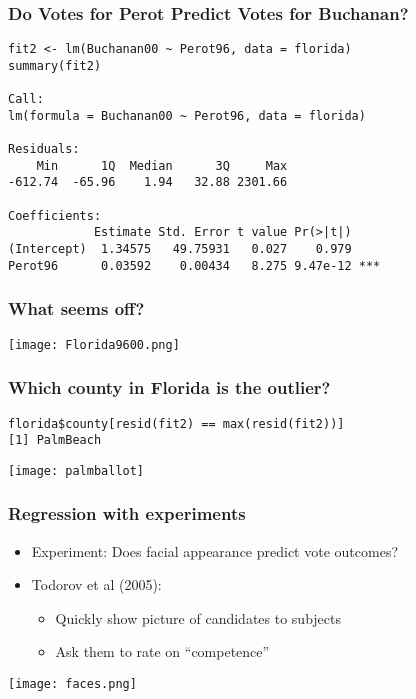 \documentclass[handout,compress]{beamer}
\begin{document}
\begin{frame}[fragile]
 \frametitle{Do Votes for Perot Predict Votes for Buchanan?}
 \begin{shaded}
\begin{small}
\begin{verbatim}
fit2 <- lm(Buchanan00 ~ Perot96, data = florida)
summary(fit2)

Call:
lm(formula = Buchanan00 ~ Perot96, data = florida)

Residuals:
    Min      1Q  Median      3Q     Max 
-612.74  -65.96    1.94   32.88 2301.66 

Coefficients:
            Estimate Std. Error t value Pr(>|t|)    
(Intercept)  1.34575   49.75931   0.027    0.979    
Perot96      0.03592    0.00434   8.275 9.47e-12 ***

\end{verbatim}
\end{small}
\end{shaded}
\end{frame}

\begin{frame}[fragile]
 \frametitle{What seems off?}
\begin{center}
\texttt{[image: Florida9600.png]}
\end{center}
\end{frame}

\begin{frame}[fragile]
 \frametitle{Which county in Florida is the outlier?}
 \begin{shaded}
\begin{verbatim}
florida$county[resid(fit2) == max(resid(fit2))]
[1] PalmBeach
\end{verbatim}
\end{shaded}
\begin{center}
\texttt{[image: palmballot]}
\end{center}
\end{frame}


\begin{frame}[fragile]
 \frametitle{Regression with experiments}
\begin{itemize}
\item Experiment: Does \alert{facial appearance} predict \alert{vote outcomes}?
\item Todorov et al (2005): 
\begin{itemize}
\item Quickly show picture of candidates to subjects
\item Ask them to rate on ``competence''
\end{itemize}
\end{itemize}
\begin{center}
\texttt{[image: faces.png]}
\end{center}
\end{frame}
\end{document}
